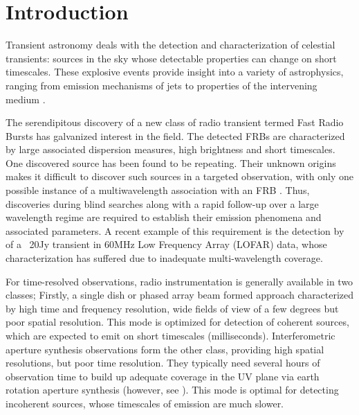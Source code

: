 \documentclass{ws-jai}
\begin{document}

\section{\label{sec:Introduction}Introduction}

\noindent Transient astronomy  deals with the detection  and characterization of
celestial transients: sources in the  sky whose detectable properties can change
on short timescales.   These explosive events provide insight into  a variety of
astrophysics,  ranging from  emission mechanisms  of jets  to properties  of the
intervening  medium \citep{fender2006lofar,lazio2009dynamic,cordes2004dynamic}.  


The serendipitous discovery of a new  class of radio transient termed Fast Radio
Bursts  \citep[FRBs;][]{spitler2015fast, thornton2013population}  has galvanized
interest in the field.  The detected  FRBs are characterized by large associated
dispersion  measures,   high  brightness   and  short  timescales.    One  \cite
{spitler2016repeating}  discovered source  has been  found to  be repeating.
Their unknown origins makes it difficult  to discover such sources in a targeted
observation, with  only one possible  instance of a  multiwavelength association
with an FRB \cite {keane2016host}. Thus, discoveries during blind searches along
with a rapid follow-up over a  large wavelength regime are required to establish
their emission  phenomena and associated  parameters.  A recent example  of this
requirement is the detection by \citet{stewart2016lofar} of a ~20Jy transient in
60MHz Low Frequency Array (LOFAR)  data, whose characterization has suffered due
to inadequate multi-wavelength coverage.

For time-resolved observations, radio  instrumentation is generally available in
two  classes; Firstly,  a  single  dish or  phased  array  beam formed  approach
characterized by  high time and frequency  resolution, wide fields of  view of a
few degrees but poor spatial resolution. This mode is optimized for detection of
coherent   sources,   which  are   expected   to   emit  on   short   timescales
(milliseconds). Interferometric  aperture synthesis observations form  the other
class,  providing  high spatial  resolutions,  but  poor time  resolution.  They
typically need several  hours of observation time to build  up adequate coverage
in  the UV  plane  via earth  rotation aperture  synthesis  (however, see  \cite
{law2012rrat,  law2012all}).   This mode  is  optimal  for detecting  incoherent
sources, whose timescales of emission are much slower.
\end{document}
